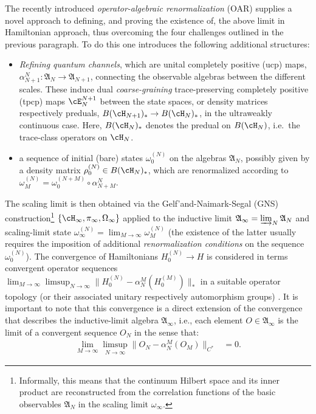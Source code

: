 \documentclass[a4paper, 11pt]{article}
\newcommand{\fA}{\mathfrak{A}}\newcommand{\cA}{\mathcal{A}}\newcommand{\dA}{\mathds{A}}\newcommand{\sA}{\mathscr{A}}
\DeclareMathOperator{\1}{\mathds{1}}
\begin{document}
The recently introduced \emph{operator-algebraic renormalization} (OAR) \cite{StottmeisterOperatorAlgebraicRenormalization, MorinelliScalingLimitsOf, BrothierConstructionsOfConformal} supplies a novel approach to defining, and proving the existence of, the above limit in Hamiltonian approach, thus overcoming the four challenges outlined in the previous paragraph. To do this one introduces the following additional structures:
\begin{itemize}
	\item \emph{Refining quantum channels}, which are unital completely positive (ucp) maps, $\alpha^{N}_{N+1}:\fA_{N}\rightarrow\fA_{N+1}$, connecting the observable algebras between the different scales. These induce dual \emph{coarse-graining} trace-preserving completely positive (tpcp) maps $\cE^{N+1}_{N}$ between the state spaces, or density matrices respectively preduals, $B(\cH_{N+1})_{*}\rightarrow B(\cH_{N})_{*}$, in the ultraweakly continuous case. Here, $B(\cH_{N})_{*}$ denotes the predual on $B(\cH_{N})$, i.e.~the trace-class operators on $\cH_{N}$.
	\item a sequence of initial (bare) states $\omega^{(N)}_{0}$ on the algebras $\mathfrak{A}_N$, possibly given by a density matrix $\rho^{(N)}_{0}\in B(\cH_{N})_{*}$, which are renormalized according to $\omega^{(N)}_{M} = \omega^{(N+M)}_{0}\circ\alpha^{N}_{N+M}$.
\end{itemize}
The scaling limit is then obtained via the Gelf'and-Naimark-Segal (GNS) construction\footnote{Informally, this means that the continuum Hilbert space and its inner product are reconstructed from the correlation functions of the basic observables $\fA_{N}$ in the scaling limit $\omega_{\infty}$.} $\{\cH_{\infty}, \pi_{\infty}, \Omega_{\infty}\}$ applied to the inductive limit $\fA_{\infty} = \varinjlim_{N}\fA_{N}$ and scaling-limit state $\omega^{(N)}_{\infty} = \lim_{M\rightarrow\infty}\omega^{(N)}_{M}$ (the existence of the latter usually requires the imposition of additional \emph{renormalization conditions} on the sequence $\omega^{(N)}_{0}$). The convergence of Hamiltonians $H^{(N)}_{0}\rightarrow H$ is considered in terms convergent operator sequences $\lim_{M\rightarrow\infty}\limsup_{N\rightarrow\infty}\|H^{(N)}_{0}-\alpha^{M}_{N}(H^{(M)}_{0})\|_{*}$ in a suitable operator topology (or their associated unitary respectively automorphism groups) \cite{DuffieldMeanFieldDynamical}. It is important to note that this convergence is a direct extension of the convergence that describes the inductive-limit algebra $\fA_{\infty}$, i.e., each element $O\in\fA_{\infty}$ is the limit of a convergent sequence $O_{N}$ in the sense that:
\begin{align*}
\lim_{M\rightarrow\infty}\limsup_{N\rightarrow\infty}\|O_{N}-\alpha^{M}_{N}(O_{M})\|_{C^{*}} & = 0.
\end{align*}
\end{document}
